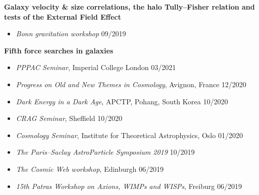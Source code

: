 \documentclass[11pt]{article}
\newenvironment{outerlist}[1][\enskip\textbullet]%
        {\begin{itemize}[#1]}{\end{itemize}%
         \vspace{-.6\baselineskip}}
\newcommand{\blankline}{\quad\pagebreak[2]}
\begin{document}
\blankline

\textbf{Galaxy velocity \& size correlations, the halo Tully--Fisher relation and tests of the External Field Effect}
\vspace{-0.35\baselineskip}
\begin{outerlist}
\item[] \textit{Bonn gravitation workshop} \hfill 09/2019 \\
\vspace{-1.\baselineskip}
\end{outerlist}

\blankline

\textbf{Fifth force searches in galaxies} 
\vspace{-0.35\baselineskip}
\begin{outerlist}
\item[] \textit{PPPAC Seminar}, Imperial College London \hfill 03/2021 \\
\vspace{-1.4\baselineskip}
\item[] \textit{Progress on Old and New Themes in Cosmology}, Avignon, France \hfill 12/2020 \\
\vspace{-1.4\baselineskip}
\item[] \textit{Dark Energy in a Dark Age}, APCTP, Pohang, South Korea \hfill 10/2020 \\
\vspace{-1.4\baselineskip}
\item[] \textit{CRAG Seminar}, Sheffield \hfill 10/2020 \\
\vspace{-1.4\baselineskip}
\item[] \textit{Cosmology Seminar}, Institute for Theoretical Astrophysics, Oslo \hfill 01/2020 \\
\vspace{-1.4\baselineskip}
\item[] \textit{The Paris--Saclay AstroParticle Symposium 2019} \hfill 10/2019 \\
\vspace{-1.4\baselineskip}
\item[] \textit{The Cosmic Web workshop}, Edinburgh \hfill 06/2019 \\
\vspace{-1.4\baselineskip}
\item[] \textit{15th Patras Workshop on Axions, WIMPs and WISPs}, Freiburg \hfill 06/2019 \\
\vspace{-1.4\baselineskip}

\end{outerlist}
\end{document}
